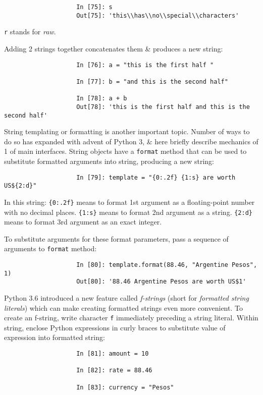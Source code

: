 \documentclass{article}
\begin{document}
\begin{itemize}
\begin{itemize}
\begin{itemize}
\begin{itemize}
\begin{verbatim}
					In [75]: s
					Out[75]: 'this\\has\\no\\special\\characters'
				\end{verbatim}
				{\tt r} stands for {\it raw}.
				
				Adding 2 strings together concatenates them \& produces a new string:
				\begin{verbatim}
					In [76]: a = "this is the first half "
					
					In [77]: b = "and this is the second half"
					
					In [78]: a + b
					Out[78]: 'this is the first half and this is the second half'
				\end{verbatim}
				String templating or formatting is another important topic. Number of ways to do so has expanded with advent of Python 3, \& here briefly describe mechanics of 1 of main interfaces. String objects have a {\tt format} method that can be used to substitute formatted arguments into string, producing a new string:
				\begin{verbatim}
					In [79]: template = "{0:.2f} {1:s} are worth US${2:d}"
				\end{verbatim}
				In this string: \verb|{0:.2f}| means to format 1st argument as a floating-point number with no decimal places. \verb|{1:s}| means to format 2nd argument as a string. \verb|{2:d}| means to format 3rd argument as an exact integer.
				
				To substitute arguments for these format parameters, pass a sequence of arguments to {\tt format} method:
				\begin{verbatim}
					In [80]: template.format(88.46, "Argentine Pesos", 1)
					Out[80]: '88.46 Argentine Pesos are worth US$1'
				\end{verbatim}
				Python 3.6 introduced a new feature called {\it f-strings} (short for {\it formatted string literals}) which can make creating formatted strings even more convenient. To create an f-string, write character {\tt f} immediately preceding a string literal. Within string, enclose Python expressions in curly braces to substitute value of expression into formatted string:
				\begin{verbatim}
					In [81]: amount = 10
					
					In [82]: rate = 88.46
					
					In [83]: currency = "Pesos"
					

\end{verbatim}
\end{itemize}
\end{itemize}
\end{itemize}
\end{itemize}
\end{document}
